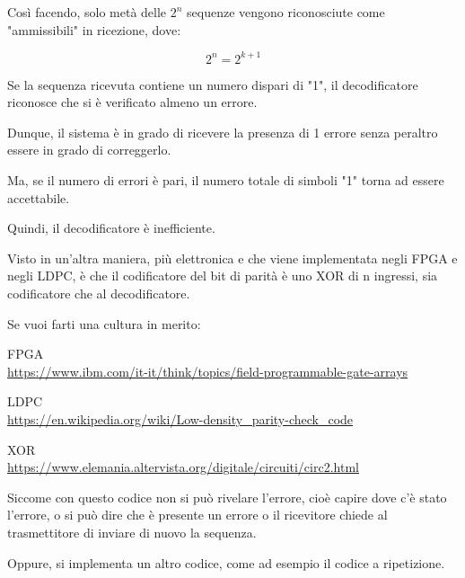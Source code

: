 Così facendo, 
solo metà delle $2^{n}$ sequenze vengono riconosciute come "ammissibili" in ricezione, 
dove: 

{
    \Large 
    \begin{equation}
        2^{n} = 2^{k+1}
    \end{equation}
} 

Se la sequenza ricevuta contiene un numero dispari di "1", 
il decodificatore riconosce che si è verificato almeno un errore. \newline 

Dunque, il sistema è in grado di ricevere la presenza di 1 errore senza peraltro essere in grado di correggerlo. \newline 

Ma, se il numero di errori è pari, il numero totale di simboli "1" torna ad essere accettabile. \newline 

Quindi, il decodificatore è inefficiente. \newline 

Visto in un'altra maniera, più elettronica e che viene implementata negli FPGA e negli LDPC, 
è che il codificatore del bit di parità è uno XOR di n ingressi, 
sia codificatore che al decodificatore. \newline 

\begin{tcolorbox}
    Se vuoi farti una cultura in merito: \newline 

    FPGA\\
    \url{https://www.ibm.com/it-it/think/topics/field-programmable-gate-arrays} \newline 

    LDPC\\
    \url{https://en.wikipedia.org/wiki/Low-density_parity-check_code} \newline 

    XOR \\
    \url{https://www.elemania.altervista.org/digitale/circuiti/circ2.html}

\end{tcolorbox}

Siccome con questo codice non si può rivelare l'errore, cioè capire dove c'è stato l'errore, 
o si può dire che è presente un errore o il ricevitore chiede al trasmettitore di inviare di nuovo la sequenza. \newline 

Oppure, si implementa un altro codice, come ad esempio il codice a ripetizione. \newline 

